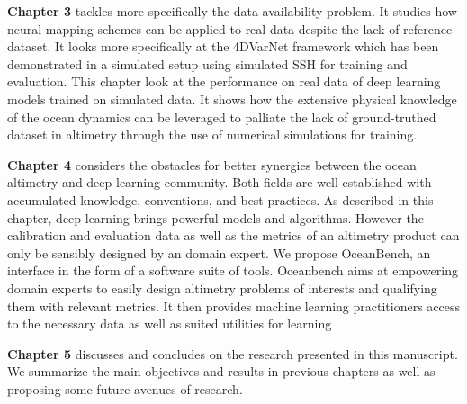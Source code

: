 \begin{bibunit}
\textbf{Chapter 3} tackles more specifically the data availability problem. It studies how neural mapping schemes can be applied to real data despite the lack of reference dataset.
It looks more specifically at the 4DVarNet framework which has been demonstrated in a simulated setup\cite{fabletENDTOENDPHYSICSINFORMEDREPRESENTATION2021} using simulated SSH for training and evaluation.
This chapter look at the performance on real data of deep learning models trained on simulated data.
It shows how the extensive physical knowledge of the ocean dynamics can be leveraged to palliate the lack of ground-truthed dataset in altimetry through the use of numerical simulations for training.

\textbf{Chapter 4} considers the obstacles for better synergies between the ocean altimetry and deep learning community.
Both fields are well established with accumulated knowledge, conventions, and best practices. 
As described in this chapter, deep learning brings powerful models and algorithms.
However the calibration and evaluation data as well as the metrics of an altimetry product can only be sensibly designed by an domain expert. 
We propose OceanBench, an interface in the form of a software suite of tools.
Oceanbench aims at empowering domain experts to easily design altimetry problems of interests and qualifying them with relevant metrics. 
It then provides machine learning practitioners access to the necessary data as well as suited utilities for learning

\textbf{Chapter 5} discusses and concludes on the research presented in this manuscript. We summarize the main objectives and results in previous chapters as well as proposing some future avenues of research.


\end{bibunit}

